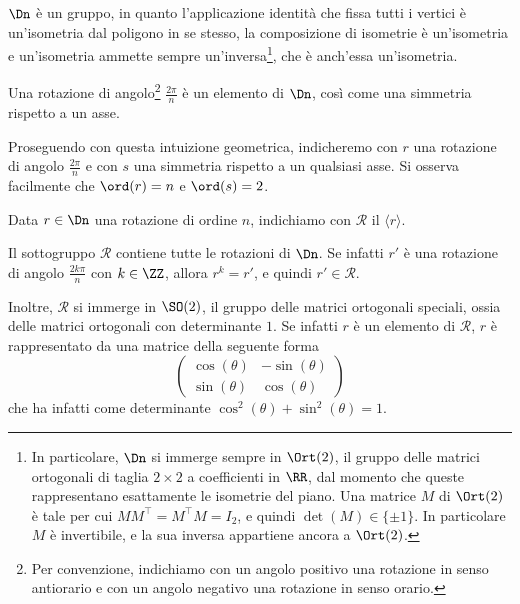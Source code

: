 \documentclass[11pt]{scrartcl}
\begin{document}
	\begin{remark}
		$\Dn$ è un gruppo, in quanto l'applicazione identità che 
		fissa tutti i vertici è un'isometria dal poligono in se stesso, la 
		composizione di isometrie è un'isometria e un'isometria ammette sempre 
		un'inversa\footnote{
			In particolare, $\Dn$ si immerge sempre in $\Ort(2)$, il gruppo delle matrici ortogonali
			di taglia $2 \times 2$ a coefficienti in $\RR$, dal momento che queste rappresentano esattamente le
			isometrie del piano. Una matrice $M$ di $\Ort(2)$ è tale per cui $M M^\top = M^\top M = I_2$, e quindi $\det(M) \in \{\pm 1\}$. In particolare $M$ è invertibile, e la
			sua inversa appartiene ancora a $\Ort(2)$.
		}, che è anch'essa un'isometria.
	\end{remark}
	
	\begin{remark}
		Una rotazione di angolo\footnote{
			Per convenzione, indichiamo con un angolo positivo una rotazione in senso antiorario e con un angolo negativo una rotazione in senso orario.
		} $\frac{2\pi}{n}$ è un elemento di $\Dn$,
		così come una simmetria rispetto a un asse.
	\end{remark}
	
	Proseguendo con questa intuizione geometrica, indicheremo con $r$ una rotazione
	di angolo $\frac{2\pi}{n}$ e con $s$ una simmetria rispetto a
	un qualsiasi asse. Si osserva facilmente che $\ord(r) = n$ e $\ord(s) = 2$.
	
	\begin{definition}
		Data $r \in \Dn$ una rotazione di ordine $n$, indichiamo con $\mathcal{R}$ il
		 $\langle r\rangle$.
	\end{definition}
	
	\begin{remark}
		Il sottogruppo $\mathcal{R}$ contiene tutte le rotazioni di $\Dn$.
		Se infatti $r'$ è una rotazione di angolo $\frac{2k\pi}{n}$ con $k \in \ZZ$,
		allora $r^k = r'$, e quindi $r' \in \mathcal{R}$. \medskip
		
		
		Inoltre, $\mathcal{R}$ si immerge in $\SO(2)$, il gruppo delle matrici ortogonali speciali,
		ossia delle matrici ortogonali con determinante $1$. Se infatti $r$ è un elemento
		di $\mathcal{R}$, $r$
		è rappresentato da una matrice della seguente forma
		\[ \begin{pmatrix}
			\cos(\theta) & -\sin(\theta) \\
			\sin(\theta) & \cos(\theta)
		\end{pmatrix} \]
		che ha infatti come determinante $\cos^2(\theta) + \sin^2(\theta) = 1$.
	\end{remark}
	
\end{document}
